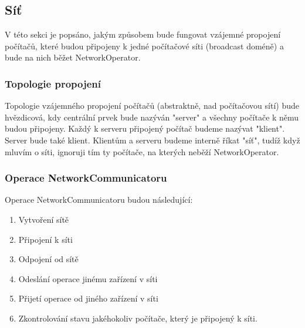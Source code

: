 \documentclass[12pt]{article}
\newcommand\nodegui{GraphicalUserInterface}
\newcommand\nodeui{UserInterface}
\newcommand\nodepm{PluginManager}
\newcommand\nodeconf{Configurator}
\newcommand\nodeo{Operator}
\newcommand\nodeoc{OperationCreator}
\newcommand\nodeop{OperationProcessor}
\newcommand\nodeci{CommunicationInterface}
\newcommand\nodeos{OperandSelector}
\newcommand\nodenm{NetworkCommunicator}
\newcommand\nodeml{MouseLogger}
\newcommand\nodekl{KeyLogger}
\newcommand\nodems{MouseSimulator}
\newcommand\nodeks{KeySimulator}
\newcommand\nodeses{ScreenEdgeSelector}
\begin{document}
\begin{center}
\end{center}

\subsection{Síť}
V této sekci je popsáno, jakým způsobem bude fungovat vzájemné propojení počítačů, které budou připojeny k jedné počítačové síti (broadcast doméně) a bude na nich běžet NetworkOperator.
\subsubsection{Topologie propojení}
Topologie vzájemného propojení počítačů (abstraktně, nad počítačovou sítí) bude hvězdicová, kdy centrální prvek bude nazýván "server" a všechny počítače k němu budou připojeny. Každý k serveru připojený počítač budeme nazývat "klient". Server bude také klient. Klientům a serveru budeme interně říkat "síť", tudíž když mluvím o síti, ignoruji tím ty počítače, na kterých neběží NetworkOperator.

\subsubsection{Operace NetworkCommunicatoru}
Operace NetworkCommunicatoru budou následující:
\begin{enumerate}
\item Vytvoření sítě
\item Připojení k síti
\item Odpojení od sítě
\item Odeslání operace jinému zařízení v síti
\item Přijetí operace od jiného zařízení v síti
\item Zkontrolování stavu jakéhokoliv počítače, který je připojený k síti.
\end{enumerate}
\end{document}
